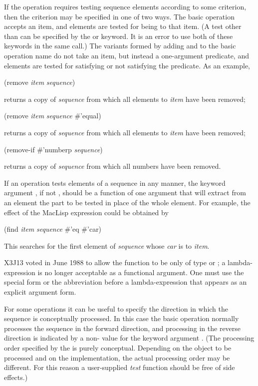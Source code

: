 If the operation requires testing sequence elements according to
some criterion, then the criterion may be specified in one of two ways.
The basic operation accepts an item,
and elements are tested for being  to that item.
(A test other than  can be specified by the 
or  keyword.  It is an error to use both
of these keywords in the same call.)
The variants formed by adding  and 
to the basic operation name do not take an item,
but instead a one-argument predicate,
and elements are tested for satisfying or not satisfying the predicate.
As an example,
\begin{lisp}
(remove \emph{item} \emph{sequence})
\end{lisp}
returns a copy of \emph{sequence} from which all elements  to \emph{item}
have been removed;
\begin{lisp}
(remove \emph{item} \emph{sequence}  \#'equal)
\end{lisp}
returns a copy of \emph{sequence} from which all elements  to \emph{item}
have been removed;
\begin{lisp}
(remove-if \#'numberp \emph{sequence})
\end{lisp}
returns a copy of \emph{sequence} from which all numbers have been removed.

If an operation tests elements of a sequence in any manner,
the keyword argument , if not {\false}, should be a function
of one argument that will extract from an element the part to be tested
in place of the whole element.
For example, the effect of the MacLisp expression
 could be obtained by
\begin{lisp}
(find \emph{item} \emph{sequence}  \#'eq  \#'car)
\end{lisp}
This searches for the first element of \emph{sequence} whose \emph{car} is 
to \emph{item}.
\begin{newer}
X3J13 voted in June 1988  to allow the  function
to be only of type  or ; a lambda-expression
is no longer acceptable as a functional argument.  One must use the
 special form or the abbreviation  before
a lambda-expression that appears as an  explicit argument form.
\end{newer}

For some operations it can be useful to specify the direction
in which the sequence is conceptually processed.  In this case the basic
operation normally processes the sequence in the forward direction,
and processing in the reverse direction is indicated by a non-{\false}
value for the keyword argument .  (The processing order
specified by the  is purely conceptual.  Depending on
the object to be processed and on the implementation, the actual processing
order may be different.  For this reason a user-supplied \emph{test} function
should be free of side effects.)

